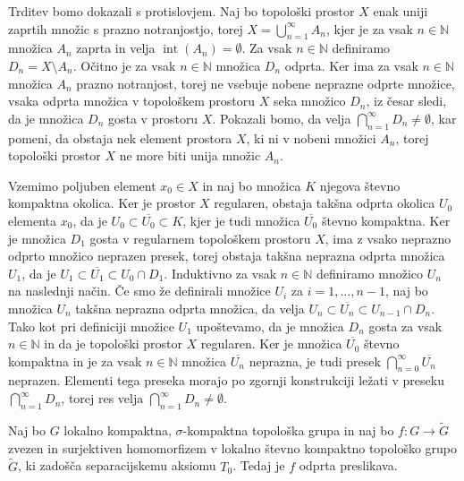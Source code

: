 \documentclass[mat1]{fmfdelo}
\newcommand{\N}{\mathbb N}
\newcommand{\closure}[1]{\overline{#1}}
\DeclareMathOperator{\interior}{int}
\begin{document}
\begin{dokaz}
Trditev bomo dokazali s protislovjem. Naj bo topološki prostor $X$ enak uniji zaprtih množic s prazno notranjostjo, torej $X = \bigcup_{n=1}^\infty A_n$, kjer je za vsak $n \in \N$ množica $A_n$ zaprta in velja $\interior(A_n) = \emptyset$. Za vsak $n \in \N$ definiramo $D_n = X \setminus A_n$. Očitno je za vsak $n \in \N$ množica $D_n$ odprta. Ker ima za vsak $n \in \N$ množica $A_n$ prazno notranjost, torej ne vsebuje nobene neprazne odprte množice, vsaka odprta množica v topološkem prostoru $X$ seka množico $D_n$, iz česar sledi, da je množica $D_n$ gosta v prostoru $X$. Pokazali bomo, da velja $\bigcap_{n=1}^\infty D_n \neq \emptyset$, kar pomeni, da obstaja nek element prostora $X$, ki ni v nobeni množici $A_n$, torej topološki prostor $X$ ne more biti unija množic $A_n$.

Vzemimo poljuben element $x_0 \in X$ in naj bo množica $K$ njegova števno kompaktna okolica. Ker je prostor $X$ regularen, obstaja takšna odprta okolica $U_0$ elementa $x_0$, da je $U_0 \subset \closure{U_0} \subset K$, kjer je tudi množica $\closure{U_0}$ števno kompaktna. Ker je množica $D_1$ gosta v regularnem topološkem prostoru $X$, ima z vsako neprazno odprto množico neprazen presek, torej obstaja takšna neprazna odprta množica $U_1$, da je $U_1 \subset \closure{U_1} \subset U_0 \cap D_1$. Induktivno za vsak $n \in \N$ definiramo množico $U_n$ na naslednji način. Če smo že definirali množice $U_i$ za $i = 1,\dots,n-1$, naj bo množica $U_n$ takšna neprazna odprta množica, da velja $U_n \subset \closure{U_n} \subset U_{n-1} \cap D_n$. Tako kot pri definiciji množice $U_1$ upoštevamo, da je množica $D_n$ gosta za vsak $n \in \N$ in da je topološki prostor $X$ regularen.
Ker je množica $\closure{U_0}$ števno kompaktna in je za vsak $n \in \N$ množica $\closure{U_n}$ neprazna, je tudi presek $\bigcap_{n=0}^\infty \closure{U_n}$ neprazen. Elementi tega preseka morajo po zgornji konstrukciji ležati v preseku $\bigcap_{n=1}^\infty D_n$, torej res velja $\bigcap_{n=1}^\infty D_n \neq \emptyset$.
\end{dokaz}

\begin{trditev}\label{trd:kompodp}
Naj bo $G$ lokalno kompaktna, $\sigma$-kompaktna topološka grupa in naj bo $f\colon G \to \widetilde{G}$ zvezen in surjektiven homomorfizem v lokalno števno kompaktno topološko grupo $\widetilde{G}$, ki zadošča separacijskemu aksiomu $T_0$. Tedaj je $f$ odprta preslikava.
\end{trditev}
\end{document}
